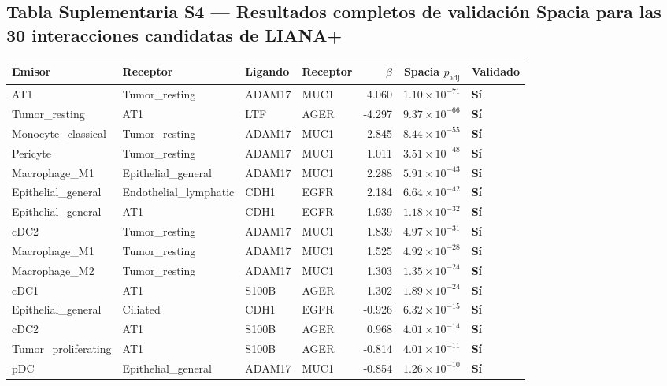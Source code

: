 \documentclass[12pt,a4paper]{article}
\begin{document}
\subsection*{Tabla Suplementaria S4 --- Resultados completos de validación Spacia para las 30 interacciones candidatas de LIANA+}
\begin{table}[h!]
\centering
\small
\begin{tabular}{@{}llllrrl@{}}
\toprule
\textbf{Emisor} & \textbf{Receptor} & \textbf{Ligando} & \textbf{Receptor} & \textbf{$\beta$} & \textbf{Spacia $p_{\text{adj}}$} & \textbf{Validado} \\
\midrule
AT1 & Tumor\_resting & ADAM17 & MUC1 & 4.060 & $1.10{\times}10^{-71}$ & \textbf{Sí} \\
Tumor\_resting & AT1 & LTF & AGER & -4.297 & $9.37{\times}10^{-66}$ & \textbf{Sí} \\
Monocyte\_classical & Tumor\_resting & ADAM17 & MUC1 & 2.845 & $8.44{\times}10^{-55}$ & \textbf{Sí} \\
Pericyte & Tumor\_resting & ADAM17 & MUC1 & 1.011 & $3.51{\times}10^{-48}$ & \textbf{Sí} \\
Macrophage\_M1 & Epithelial\_general & ADAM17 & MUC1 & 2.288 & $5.91{\times}10^{-43}$ & \textbf{Sí} \\
Epithelial\_general & Endothelial\_lymphatic & CDH1 & EGFR & 2.184 & $6.64{\times}10^{-42}$ & \textbf{Sí} \\
Epithelial\_general & AT1 & CDH1 & EGFR & 1.939 & $1.18{\times}10^{-32}$ & \textbf{Sí} \\
cDC2 & Tumor\_resting & ADAM17 & MUC1 & 1.839 & $4.97{\times}10^{-31}$ & \textbf{Sí} \\
Macrophage\_M1 & Tumor\_resting & ADAM17 & MUC1 & 1.525 & $4.92{\times}10^{-28}$ & \textbf{Sí} \\
Macrophage\_M2 & Tumor\_resting & ADAM17 & MUC1 & 1.303 & $1.35{\times}10^{-24}$ & \textbf{Sí} \\
cDC1 & AT1 & S100B & AGER & 1.302 & $1.89{\times}10^{-24}$ & \textbf{Sí} \\
Epithelial\_general & Ciliated & CDH1 & EGFR & -0.926 & $6.32{\times}10^{-15}$ & \textbf{Sí} \\
cDC2 & AT1 & S100B & AGER & 0.968 & $4.01{\times}10^{-14}$ & \textbf{Sí} \\
Tumor\_proliferating & AT1 & S100B & AGER & -0.814 & $4.01{\times}10^{-11}$ & \textbf{Sí} \\
pDC & Epithelial\_general & ADAM17 & MUC1 & -0.854 & $1.26{\times}10^{-10}$ & \textbf{Sí} \\

\end{tabular}
\end{table}
\end{document}
